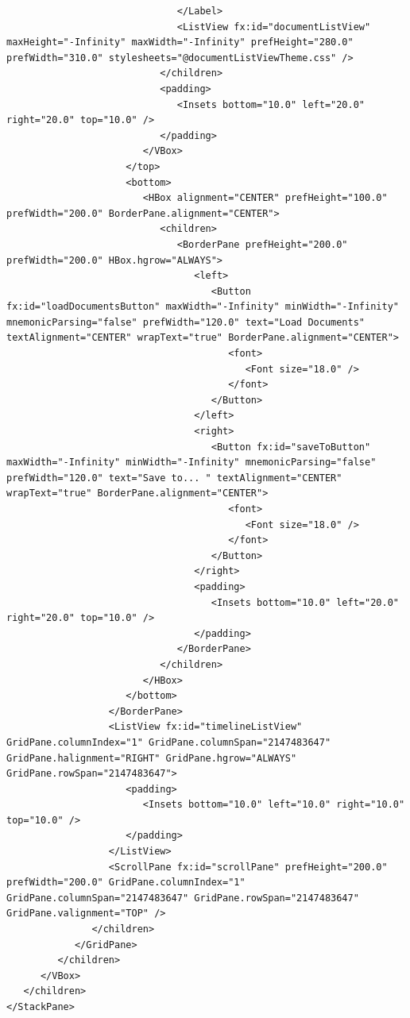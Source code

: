\begin{lstlisting}
                              </Label>
                              <ListView fx:id="documentListView" maxHeight="-Infinity" maxWidth="-Infinity" prefHeight="280.0" prefWidth="310.0" stylesheets="@documentListViewTheme.css" />
                           </children>
                           <padding>
                              <Insets bottom="10.0" left="20.0" right="20.0" top="10.0" />
                           </padding>
                        </VBox>
                     </top>
                     <bottom>
                        <HBox alignment="CENTER" prefHeight="100.0" prefWidth="200.0" BorderPane.alignment="CENTER">
                           <children>
                              <BorderPane prefHeight="200.0" prefWidth="200.0" HBox.hgrow="ALWAYS">
                                 <left>
                                    <Button fx:id="loadDocumentsButton" maxWidth="-Infinity" minWidth="-Infinity" mnemonicParsing="false" prefWidth="120.0" text="Load Documents" textAlignment="CENTER" wrapText="true" BorderPane.alignment="CENTER">
                                       <font>
                                          <Font size="18.0" />
                                       </font>
                                    </Button>
                                 </left>
                                 <right>
                                    <Button fx:id="saveToButton" maxWidth="-Infinity" minWidth="-Infinity" mnemonicParsing="false" prefWidth="120.0" text="Save to... " textAlignment="CENTER" wrapText="true" BorderPane.alignment="CENTER">
                                       <font>
                                          <Font size="18.0" />
                                       </font>
                                    </Button>
                                 </right>
                                 <padding>
                                    <Insets bottom="10.0" left="20.0" right="20.0" top="10.0" />
                                 </padding>
                              </BorderPane>
                           </children>
                        </HBox>
                     </bottom>
                  </BorderPane>
                  <ListView fx:id="timelineListView" GridPane.columnIndex="1" GridPane.columnSpan="2147483647" GridPane.halignment="RIGHT" GridPane.hgrow="ALWAYS" GridPane.rowSpan="2147483647">
                     <padding>
                        <Insets bottom="10.0" left="10.0" right="10.0" top="10.0" />
                     </padding>
                  </ListView>
                  <ScrollPane fx:id="scrollPane" prefHeight="200.0" prefWidth="200.0" GridPane.columnIndex="1" GridPane.columnSpan="2147483647" GridPane.rowSpan="2147483647" GridPane.valignment="TOP" />
               </children>
            </GridPane>
         </children>
      </VBox>
   </children>
</StackPane>
\end{lstlisting}
